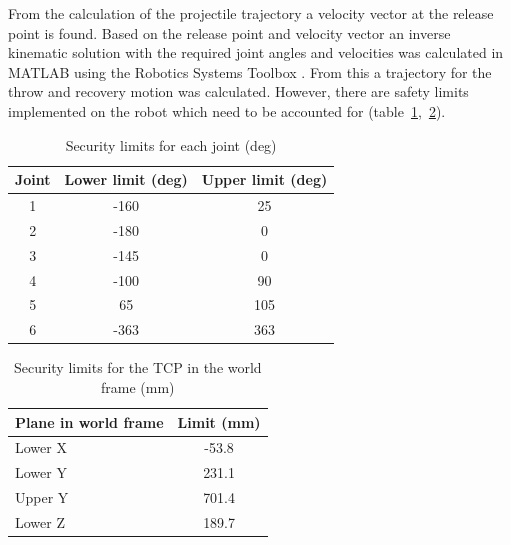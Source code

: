 From the calculation of the projectile trajectory a velocity vector at the release point is found. Based on the release point and velocity vector an inverse kinematic solution with the required joint angles and velocities was calculated in MATLAB \cite{matlab2024b} using the Robotics Systems Toolbox \cite{roboticsToolbox}. From this a trajectory for the throw and recovery motion was calculated. However, there are safety limits implemented on the robot which need to be accounted for (table~\ref{tab:jointLimits},~\ref{tab:tcpLimits}).  

\begin{table}[H]
  \centering
  \caption{Security limits for each joint (deg)}
  \label{tab:jointLimits}
  \begin{tabular}{|c|c|c|}
    \hline
    Joint & Lower limit (deg) & Upper limit (deg) \\ \hline
    1 & -160 & 25 \\
    2 & -180 & 0 \\
    3 & -145 & 0 \\
    4 & -100 & 90 \\
    5 & 65   & 105 \\
    6 & -363 & 363 \\ \hline
  \end{tabular}
\end{table}

\begin{table}[H]
  \centering
  \caption{Security limits for the TCP in the world frame (mm)}
  \label{tab:tcpLimits}
  \begin{tabular}{|l|c|}
    \hline
    Plane in world frame & Limit (mm) \\ \hline
    Lower X & -53.8 \\
    Lower Y & 231.1 \\
    Upper Y & 701.4 \\
    Lower Z & 189.7 \\ \hline
  \end{tabular}
\end{table}

